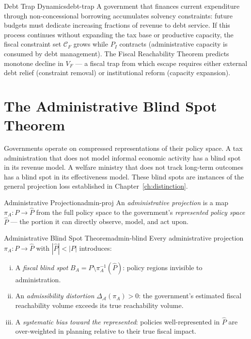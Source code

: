 \documentclass[12pt,twoside,openright]{book}
\newcommand{\adm}{\mathcal{A}}
\begin{document}
\begin{example}{Debt Trap Dynamics}{debt-trap}
  A government that finances current expenditure through
  non-concessional borrowing accumulates solvency
  constraints: future budgets must dedicate increasing
  fractions of revenue to debt service.
  If this process continues without expanding the tax
  base or productive capacity, the fiscal constraint set
  $\mathcal{C}_F$ grows while $P_I$ contracts
  (administrative capacity is consumed by debt management).
  The Fiscal Reachability Theorem predicts monotone
  decline in $V_F$ — a fiscal trap from which escape
  requires either external debt relief (constraint
  removal) or institutional reform (capacity expansion).
\end{example}

\section{The Administrative Blind Spot Theorem}

Governments operate on compressed representations of
their policy space. A tax administration that does not
model informal economic activity has a blind spot in its
revenue model. A welfare ministry that does not track
long-term outcomes has a blind spot in its effectiveness
model. These blind spots are instances of the general
projection loss established in Chapter~\ref{ch:distinction}.

\begin{definition}{Administrative Projection}{admin-proj}
  An \emph{administrative projection} is a map
  $\pi_A : P \to \hat{P}$ from the full policy space
  to the government's \emph{represented policy space}
  $\hat{P}$ — the portion it can directly observe,
  model, and act upon.
\end{definition}

\begin{theorem}{Administrative Blind Spot Theorem}{admin-blind}
  Every administrative projection $\pi_A : P \to \hat{P}$
  with $|\hat{P}| < |P|$ introduces:
  \begin{enumerate}[(i)]
    \item A \emph{fiscal blind spot}
          $B_A = P \setminus \pi_A^{-1}(\hat{P})$:
          policy regions invisible to administration.
    \item An \emph{admissibility distortion}
          $\Delta_\adm(\pi_A) > 0$: the government's
          estimated fiscal reachability volume exceeds
          its true reachability volume.
    \item A \emph{systematic bias toward the represented}:
          policies well-represented in $\hat{P}$ are
          over-weighted in planning relative to their
          true fiscal impact.
  \end{enumerate}
\end{theorem}
\end{document}

